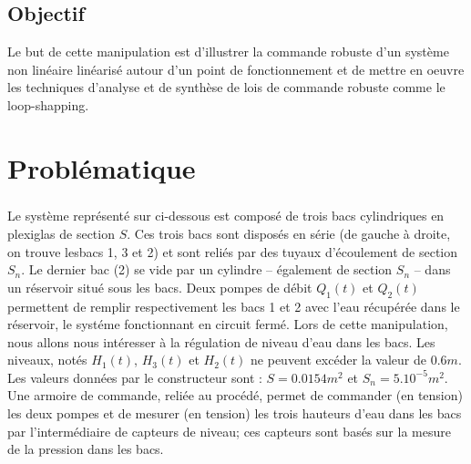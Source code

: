 \documentclass[12pt, a4paper, openany]{report}
\begin{document}
 
 
 \section*{Objectif}
  Le but de cette manipulation est d'illustrer la commande robuste d'un système non linéaire linéarisé autour d'un point de fonctionnement et de mettre en oeuvre les techniques d'analyse et de synthèse de lois de commande robuste comme le loop-shapping.\\
                                                      



\chapter*{Problématique}
 
 \paragraph{}
Le système représenté sur ci-dessous est composé de trois bacs cylindriques en plexiglas de section $S$. Ces trois bacs sont disposés en série (de gauche à droite, on trouve lesbacs 1, 3 et 2) et sont reliés par des tuyaux d’écoulement de section $S_{n}$. Le dernier bac (2) se vide par un cylindre – également de section $S_{n}$ – dans un réservoir situé sous les bacs. Deux pompes de débit $Q_{1} (t)$ \hspace{1mm}et \hspace{1mm}$Q_{2} (t)$ permettent de remplir respectivement les bacs 1 et 2 avec l’eau récupérée dans le réservoir, le systéme fonctionnant en circuit fermé. Lors de cette manipulation, nous allons nous intéresser à la régulation de niveau d’eau dans les bacs. Les niveaux, notés $H_{1} (t)$, $H_{3} (t)$\hspace{1mm} et \hspace{1mm}$ H_{2} (t)$ ne peuvent excéder la valeur de $0.6 m$. Les valeurs données par le constructeur sont : $S = 0.0154m^{2}$\hspace{1mm} et\hspace{1mm} $S_{n} = 5.10^{-5} m^{2} $. Une armoire de commande, reliée au procédé, permet de commander (en tension) les deux pompes et de mesurer (en tension) les trois hauteurs d’eau dans les bacs par l’intermédiaire de capteurs de niveau; ces capteurs sont basés sur la mesure de la pression dans les bacs. 
 
\end{document}
